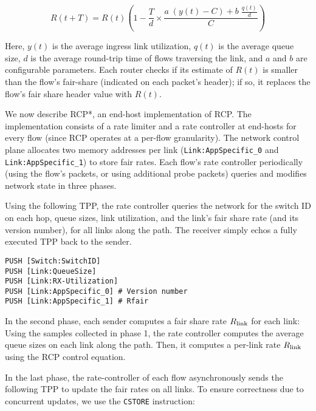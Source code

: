 \begin{equation}\label{eq:rcp}
R(t+T) = R(t)\left(1 - \frac{T}{d}\times\frac{a\;(y(t) - C) + b\;\frac{q(t)}{d}}{C}\right)
\end{equation}

Here, $y(t)$ is the average ingress link utilization, $q(t)$ is the
average queue size, $d$ is the average round-trip time of flows
traversing the link, and $a$ and $b$ are configurable parameters.
Each router checks if its estimate of $R(t)$ is smaller than the
flow's fair-share (indicated on each packet's header); if so, it
replaces the flow's fair share header value with $R(t)$.

We now describe RCP*, an end-host implementation of RCP\@.  The
implementation consists of a rate limiter and a rate controller at
end-hosts for every flow (since RCP operates at a per-flow
granularity).  The network control plane allocates two memory
addresses per link ({\tt Link:AppSpecific\_0} and {\tt
Link:AppSpecific\_1}) to store fair rates.  Each flow's rate
controller periodically (using the flow's packets, or using additional
probe packets) queries and modifies network state in three phases.

  Using the following TPP, the rate
controller queries the network for the switch ID on each hop, queue
sizes, link utilization, and the link's fair share rate (and its
version number), for all links along the path.  The receiver simply
echos a fully executed TPP back to the sender.  

\begin{verbatim}
PUSH [Switch:SwitchID]
PUSH [Link:QueueSize]
PUSH [Link:RX-Utilization]
PUSH [Link:AppSpecific_0] # Version number
PUSH [Link:AppSpecific_1] # Rfair
\end{verbatim}
  In the second phase, each sender
computes a fair share rate $R_{\rm link}$ for each link: Using the
samples collected in phase 1, the rate controller computes the average
queue sizes on each link along the path.  Then, it computes a per-link
rate $R_{\rm link}$ using the RCP control equation.

  In the last phase, the
rate-controller of each flow asynchronously sends the following TPP to
update the fair rates on all links.  To ensure correctness due to
concurrent updates, we use the {\tt CSTORE} instruction:

